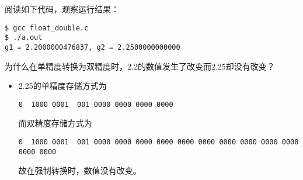 %
\begin{frame}[fragile]
阅读如下代码，观察运行结果：

\end{frame}
%
\begin{frame}[fragile]
\begin{lstlisting}
$ gcc float_double.c
$ ./a.out
g1 = 2.2000000476837, g2 = 2.2500000000000
\end{lstlisting}
\end{frame}
%
\begin{frame}[fragile]
\begin{wenti}

为什么在单精度转换为双精度时，2.2的数值发生了改变而2.25却没有改变？
\end{wenti} 
\end{frame}
%
\begin{frame}[fragile]

\begin{itemize}
\item 2.25的单精度存储方式为
\begin{lstlisting}
0  1000 0001  001 0000 0000 0000 0000
\end{lstlisting}
而双精度存储方式为
\begin{lstlisting}
0  1000 0001  001 0000 0000 0000 0000 0000 0000 0000 0000 0000 0000 0000 0000
\end{lstlisting}
故在强制转换时，数值没有改变。
\end{itemize}

\end{frame}

